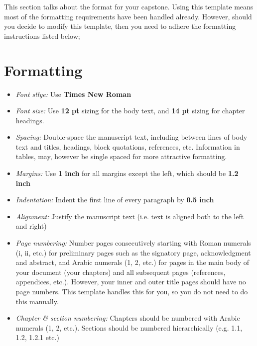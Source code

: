 This section talks about the format for your capstone. Using this template means most of the formatting requirements have been handled already. However, should you decide to modify this template, then you need to adhere the formatting instructions listed below;

\section{Formatting}
\begin{itemize}
    \item \emph{Font stlye:} Use \textbf{Times New Roman}
    
    \item \emph{Font size:}  Use \textbf{12 pt} sizing for the body text, and \textbf{14 pt} sizing for chapter headings.
    
    \item \emph{Spacing:} Double-space the manuscript text, including between lines of body text and titles, headings, block quotations, references, etc.  Information in tables, may, however be single spaced for more attractive formatting.
    
    \item \emph{Margins:} Use \textbf{1 inch} for all margins except the left, which should be \textbf{1.2 inch}
    
    \item \emph{Indentation:} Indent the first line of every paragraph by \textbf{0.5 inch}
    
    \item \emph{Alignment:} Justify the manuscript text (i.e. text is aligned both to the left and right)
    
    \item \emph{Page numbering:} Number pages consecutively starting with Roman numerals (i, ii, etc.) for preliminary pages such as the signatory page, acknowledgment and abstract, and Arabic numerals (1, 2, etc.) for pages in the main body of your document (your chapters) and all subsequent pages (references, appendices, etc.).   However, your inner and outer title pages should have no page numbers. This template handles this for you, so you do not need to do this manually.

    \item \emph{Chapter \& section numbering:} Chapters should be numbered with Arabic numerals (1, 2, etc.).  Sections should be numbered hierarchically (e.g. 1.1, 1.2, 1.2.1 etc.)\\


\end{itemize}
